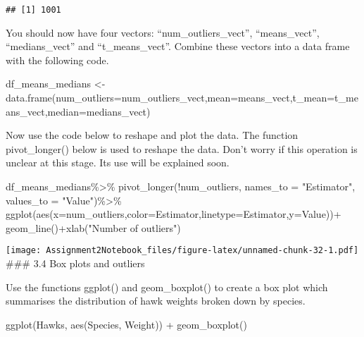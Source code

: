 \documentclass[
]{article}
\newenvironment{Shaded}{\begin{snugshade}}{\end{snugshade}}
\newcommand{\AttributeTok}[1]{\textcolor[rgb]{0.77,0.63,0.00}{#1}}
\newcommand{\FunctionTok}[1]{\textcolor[rgb]{0.00,0.00,0.00}{#1}}
\newcommand{\NormalTok}[1]{#1}
\newcommand{\OtherTok}[1]{\textcolor[rgb]{0.56,0.35,0.01}{#1}}
\newcommand{\SpecialCharTok}[1]{\textcolor[rgb]{0.00,0.00,0.00}{#1}}
\newcommand{\StringTok}[1]{\textcolor[rgb]{0.31,0.60,0.02}{#1}}
\begin{document}
\begin{verbatim}
## [1] 1001
\end{verbatim}

You should now have four vectors: ``num\_outliers\_vect'',
``means\_vect'', ``medians\_vect'' and ``t\_means\_vect''. Combine these
vectors into a data frame with the following code.

\begin{Shaded}
\begin{Highlighting}[]
\NormalTok{df\_means\_medians }\OtherTok{\textless{}{-}} \FunctionTok{data.frame}\NormalTok{(}\AttributeTok{num\_outliers=}\NormalTok{num\_outliers\_vect,}\AttributeTok{mean=}\NormalTok{means\_vect,}\AttributeTok{t\_mean=}\NormalTok{t\_means\_vect,}\AttributeTok{median=}\NormalTok{medians\_vect)}
\end{Highlighting}
\end{Shaded}

Now use the code below to reshape and plot the data. The function
pivot\_longer() below is used to reshape the data. Don't worry if this
operation is unclear at this stage. Its use will be explained soon.

\begin{Shaded}
\begin{Highlighting}[]
\NormalTok{df\_means\_medians}\SpecialCharTok{\%\textgreater{}\%}
  \FunctionTok{pivot\_longer}\NormalTok{(}\SpecialCharTok{!}\NormalTok{num\_outliers, }\AttributeTok{names\_to =} \StringTok{"Estimator"}\NormalTok{, }\AttributeTok{values\_to =} \StringTok{"Value"}\NormalTok{)}\SpecialCharTok{\%\textgreater{}\%}
  \FunctionTok{ggplot}\NormalTok{(}\FunctionTok{aes}\NormalTok{(}\AttributeTok{x=}\NormalTok{num\_outliers,}\AttributeTok{color=}\NormalTok{Estimator,}\AttributeTok{linetype=}\NormalTok{Estimator,}\AttributeTok{y=}\NormalTok{Value))}\SpecialCharTok{+}
  \FunctionTok{geom\_line}\NormalTok{()}\SpecialCharTok{+}\FunctionTok{xlab}\NormalTok{(}\StringTok{"Number of outliers"}\NormalTok{)}
\end{Highlighting}
\end{Shaded}

\texttt{[image: Assignment2Notebook\_files/figure-latex/unnamed-chunk-32-1.pdf]}
\#\#\# 3.4 Box plots and outliers

Use the functions ggplot() and geom\_boxplot() to create a box plot
which summarises the distribution of hawk weights broken down by
species.

\begin{Shaded}
\begin{Highlighting}[]
\FunctionTok{ggplot}\NormalTok{(Hawks, }\FunctionTok{aes}\NormalTok{(Species, Weight)) }\SpecialCharTok{+} \FunctionTok{geom\_boxplot}\NormalTok{()}
\end{Highlighting}
\end{Shaded}
\end{document}
